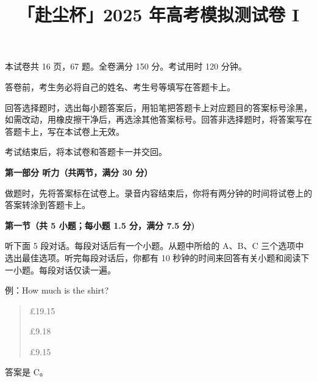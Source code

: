 \documentclass{exam-zh}
\title{「赴尘杯」2025 年高考模拟测试卷 I}
\begin{document}

\vspace{1\baselineskip}

\secret

\maketitle

本试卷共 16 页，67 题。全卷满分 150 分。考试用时 120 分钟。

\begin{notice}[][itemsep=0pt, parsep=0pt, topsep=0pt, partopsep=0pt]
\item 答卷前，考生务必将自己的姓名、考生号等填写在答题卡上。
\item 回答选择题时，选出每小题答案后，用铅笔把答题卡上对应题目的答案标号涂黑，如需改动，用橡皮擦干净后，再选涂其他答案标号。回答非选择题时，将答案写在答题卡上，写在本试卷上无效。
\item 考试结束后，将本试卷和答题卡一并交回。
\end{notice}


\begin{flushleft}
  {\bfseries 第一部分 \hspace{0.5em} 听力（共两节，满分 30 分）}
\end{flushleft}
\vspace{-0.5\baselineskip}

做题时，先将答案标在试卷上。录音内容结束后，你将有两分钟的时间将试卷上的答案转涂到答题卡上。

\vspace{-0.5\baselineskip}
\begin{flushleft}
{\bfseries 第一节（共 5 小题；每小题 1.5 分，满分 7.5 分)}
\end{flushleft}
\vspace{-0.5\baselineskip}

听下面 5 段对话。每段对话后有一个小题。从题中所给的 A、B、C 三个选项中选出最佳选项。听完每段对话后，你都有 10 秒钟的时间来回答有关小题和阅读下一小题。每段对话仅读一遍。

\begin{flushleft}

例：How much is the shirt?

\vspace{-0.5\baselineskip}
\begin{quote}
  \begin{choices}
  \item \pounds 19.15
  \item \pounds 9.18
  \item \pounds 9.15
  \end{choices}
\end{quote}
\vspace{-0.5\baselineskip}
答案是 C。

\end{flushleft}
\end{document}
